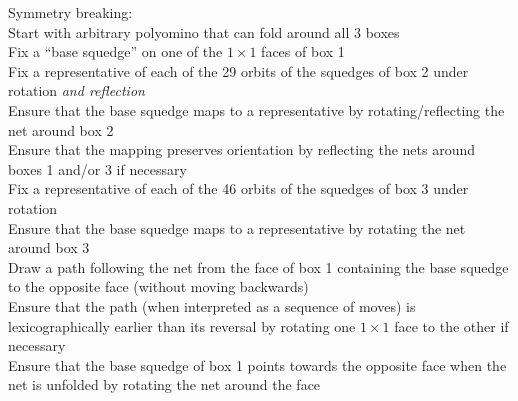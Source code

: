 \documentclass{article}
\begin{document}
Symmetry breaking: \\
Start with arbitrary polyomino that can fold around all 3 boxes \\
Fix a ``base squedge'' on one of the $1 \times 1$ faces of box 1 \\
Fix a representative of each of the 29 orbits of the squedges of box 2
under rotation \textit{and reflection} \\
Ensure that the base squedge maps to a representative
by rotating/reflecting the net around box 2 \\
Ensure that the mapping preserves orientation
by reflecting the nets around boxes 1 and/or 3 if necessary \\
Fix a representative of each of the 46 orbits of the squedges of box 3
under rotation \\
Ensure that the base squedge maps to a representative
by rotating the net around box 3 \\
Draw a path following the net from the face of box 1 containing the base squedge
to the opposite face (without moving backwards) \\
Ensure that the path (when interpreted as a sequence of moves)
is lexicographically earlier than its reversal
by rotating one $1 \times 1$ face to the other if necessary \\
Ensure that the base squedge of box 1 points towards the opposite face
when the net is unfolded 
by rotating the net around the face
\end{document}
